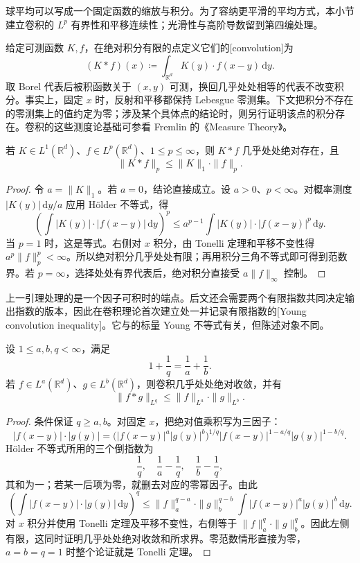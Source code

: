 球平均可以写成一个固定函数的缩放与积分。为了容纳更平滑的平均方式，本小节建立卷积的 \(L^p\) 有界性和平移连续性；光滑性与高阶导数留到第四编处理。

\ProseParagraphBreak

给定可测函数 \(K,f\)，在绝对积分有限的点定义它们的[convolution]为
\[
 (K*f)(x)\coloneqq\int_{\mathbb R^d}K(y)\cdot f(x-y)\,\mathrm dy.
\]
取 Borel 代表后被积函数关于 \((x,y)\) 可测，换回几乎处处相等的代表不改变积分。事实上，固定 \(x\) 时，反射和平移都保持 Lebesgue 零测集。下文把积分不存在的零测集上的值约定为零；涉及某个具体点的结论时，则另行证明该点的积分存在。卷积的这些测度论基础可参看 Fremlin 的《Measure Theory》\cite[255F--L]{Fremlin2016Measure}。

\begin{lemma}\label{b1:lem:convolution-lp-bound}
若 \(K\in L^1(\mathbb R^d)\)、\(f\in L^p(\mathbb R^d)\)、\(1\leq p\leq\infty\)，则 \(K*f\) 几乎处处绝对存在，且
\[
 \|K*f\|_p\leq\|K\|_1\cdot\|f\|_p.
\]
\end{lemma}
\begin{proof}
令 \(a=\|K\|_1\)。若 \(a=0\)，结论直接成立。设 \(a>0\)、\(p<\infty\)。对概率测度 \(|K(y)|\,\mathrm dy/a\) 应用 Hölder 不等式，得
\[
 \left(\int|K(y)|\cdot|f(x-y)|\,\mathrm dy\right)^p
 \leq a^{p-1}\int|K(y)|\cdot|f(x-y)|^p\,\mathrm dy.
\]
当 \(p=1\) 时，这是等式。右侧对 \(x\) 积分，由 Tonelli 定理和平移不变性得 \(a^p\|f\|_p^p<\infty\)。所以绝对积分几乎处处有限；再用积分三角不等式即可得到范数界。若 \(p=\infty\)，选择处处有界代表后，绝对积分直接受 \(a\|f\|_\infty\) 控制。
\end{proof}

上一引理处理的是一个因子可积时的端点。后文还会需要两个有限指数共同决定输出指数的版本，因此在卷积理论首次建立处一并记录有限指数的[Young convolution inequality]。它与的标量 Young 不等式有关，但陈述对象不同。

\begin{lemma}[Young]\label{b1:lem:young-convolution-finite}
设 \(1\le a,b,q<\infty\)，满足
\[
 1+\frac1q=\frac1a+\frac1b.
\]
若 \(f\in L^a(\mathbb R^d)\)、\(g\in L^b(\mathbb R^d)\)，则卷积几乎处处绝对收敛，并有
\[
 \|f*g\|_{L^q}\leq\|f\|_{L^a}\cdot\|g\|_{L^b}.
\]
\end{lemma}
\begin{proof}
条件保证 \(q\ge a,b\)。对固定 \(x\)，把绝对值乘积写为三因子：
\[
 |f(x-y)|\cdot|g(y)|
 =\bigl(|f(x-y)|^a|g(y)|^b\bigr)^{1/q}
    |f(x-y)|^{1-a/q}|g(y)|^{1-b/q}.
\]
Hölder 不等式所用的三个倒指数为
\[
 \frac1q,\quad \frac1a-\frac1q,\quad \frac1b-\frac1q,
\]
其和为一；若某一后项为零，就删去对应的零幂因子。由此
\[
 \left(\int|f(x-y)|\cdot|g(y)|\,\mathrm dy\right)^q
 \leq \|f\|_a^{q-a}\cdot\|g\|_b^{q-b}
         \int |f(x-y)|^a|g(y)|^b\,\mathrm dy.
\]
对 \(x\) 积分并使用 Tonelli 定理及平移不变性，右侧等于
\(\|f\|_a^q\cdot\|g\|_b^q\)。因此左侧有限，这同时证明几乎处处绝对收敛和所求界。零范数情形直接为零，\(a=b=q=1\) 时整个论证就是 Tonelli 定理。
\end{proof}


